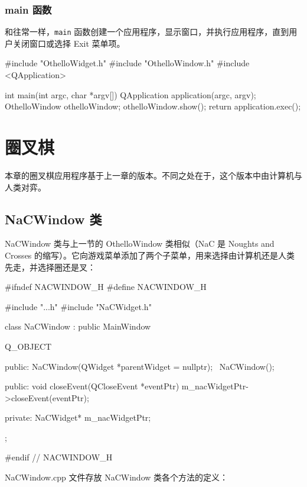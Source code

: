 \subsubsection{main 函数}

和往常一样，\texttt{main} 函数创建一个应用程序，显示窗口，并执行应用程序，直到用户关闭窗口或选择 Exit 菜单项。

\medskip{}

\begin{codebox}
#include "OthelloWidget.h"
#include "OthelloWindow.h"
#include <QApplication>

int main(int argc, char *argv[]) {
  QApplication application(argc, argv);
  OthelloWindow othelloWindow;
  othelloWindow.show();
  return application.exec();
}
\end{codebox}

\section{圈叉棋}

本章的圈叉棋应用程序基于上一章的版本。不同之处在于，这个版本中由计算机与人类对弈。

\subsection{NaCWindow 类}

NaCWindow 类与上一节的 OthelloWindow 类相似（NaC 是 Noughts and Crosses 的缩写）。它向游戏菜单添加了两个子菜单，用来选择由计算机还是人类先走，并选择圈还是叉：

\medskip{}

\begin{codebox}
#ifndef NACWINDOW_H
#define NACWINDOW_H

#include "..\MainWindow\MainWindow.h"
#include "NaCWidget.h"

class NaCWindow : public MainWindow {
  Q_OBJECT

  public:
    NaCWindow(QWidget *parentWidget = nullptr);
    ~NaCWindow();

  public:
    void closeEvent(QCloseEvent *eventPtr)
                   {m_nacWidgetPtr->closeEvent(eventPtr);}

  private:
    NaCWidget* m_nacWidgetPtr;
};

#endif // NACWINDOW_H
\end{codebox}

NaCWindow.cpp 文件存放 NaCWindow 类各个方法的定义：

